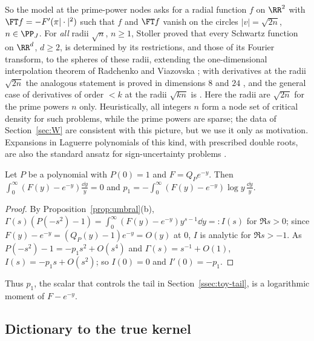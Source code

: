 So the model at the prime-power nodes asks for a radial function $f$ on $\RR^2$ with $\FT f=-F'(\pi|\cdot|^2)$ such
that $f$ and $\FT f$ vanish on the circles $|v|=\sqrt{2n}$, $n\in\PP_J$. For \emph{all} radii $\sqrt n$, $n\ge1$, Stoller
\cite{Sto21} proved that every Schwartz function on $\RR^d$, $d\ge2$, is determined by its restrictions, and those of its
Fourier transform, to the spheres of these radii, extending the one-dimensional interpolation theorem of Radchenko and
Viazovska \cite[Theorems~1 and~2]{RV19}; with derivatives at the radii $\sqrt{2n}$ the analogous statement is proved in
dimensions $8$ and $24$ \cite[Theorem~1.7]{CKMRV22}, and the general case of derivatives of order $<k$ at the radii $\sqrt{kn}$
is \cite[Open Problem~7.1]{CKMRV22}. Here the radii are $\sqrt{2n}$ for the prime powers $n$ only. Heuristically, all
integers $n$ form a node set of critical density for such problems, while the prime powers are sparse; the data
of Section~\ref{sec:W} are consistent with this picture, but we use it only as motivation. Expansions in Laguerre
polynomials of this kind, with prescribed double roots, are also the standard ansatz for sign-uncertainty problems
\cite{CG19}.

\begin{lemma}\label{lem:p1-integral}
Let $P$ be a polynomial with $P(0)=1$ and $F=Q_Pe^{-y}$. Then $\int_0^\infty(F(y)-e^{-y})\frac{\dd y}{y}=0$ and
$p_1=-\int_0^\infty(F(y)-e^{-y})\log y\,\frac{\dd y}{y}$.
\end{lemma}

\begin{proof}
By Proposition~\ref{prop:umbral}(b), $\Gamma(s)(P(-s^2)-1)=\int_0^\infty(F(y)-e^{-y})y^{s-1}\dd y=:I(s)$ for
$\Re s>0$; since $F(y)-e^{-y}=(Q_P(y)-1)e^{-y}=O(y)$ at $0$, $I$ is analytic for $\Re s>-1$. As
$P(-s^2)-1=-p_1s^2+O(s^4)$ and $\Gamma(s)=s^{-1}+O(1)$, $I(s)=-p_1s+O(s^2)$; so $I(0)=0$ and $I'(0)=-p_1$.
\end{proof}

Thus $p_1$, the scalar that controls the tail in Section~\ref{ssec:toy-tail}, is a logarithmic moment of
$F-e^{-y}$.

\subsection{Dictionary to the true kernel}\label{ssec:dictionary}

